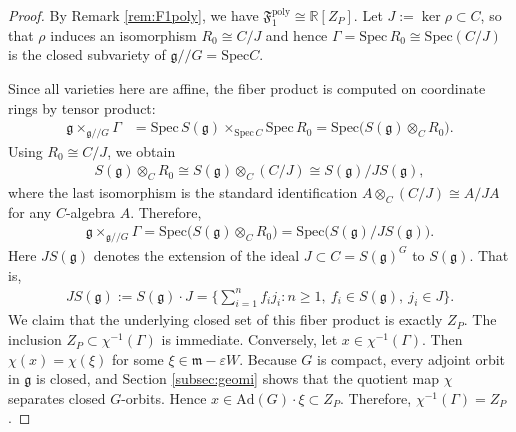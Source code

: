\documentclass[11pt]{amsart}
\theoremstyle{definition}
\theoremstyle{plain}
\theoremstyle{conclusion}
\begin{document}
\begin{proof}
By Remark \ref{rem:F1poly}, we have $\mathfrak{F}_1^{\mathrm{poly}}\cong \mathbb{R}[Z_P]$. Let $J:= \ker \rho \subset C$, so that $\rho$ induces an isomorphism $R_0\cong C/J$ and hence $\Gamma=\mathrm{Spec} \, R_0\cong \mathrm{Spec} (C/J)$ is the closed subvariety of $\mathfrak{g}//G= \mathrm{Spec}  C$.

Since all varieties here are affine, the fiber product is computed on coordinate rings by tensor product: \begin{align*}
\mathfrak{g}\times_{\mathfrak{g}//G}\Gamma &=\mathrm{Spec} \, S(\mathfrak{g})\times_{\mathrm{Spec} \, C}\mathrm{Spec} \, R_0  =\mathrm{Spec} \big(S(\mathfrak{g})\otimes_C R_0\big).
\end{align*} Using $R_0\cong C/J$, we obtain \begin{align*}
S(\mathfrak{g})\otimes_C R_0\cong S(\mathfrak{g})\otimes_C (C/J)\cong S(\mathfrak{g})/J S(\mathfrak{g}),
\end{align*} where the last isomorphism is the standard identification $A\otimes_C (C/J)\cong A/JA$ for any $C$-algebra $A$. Therefore, \begin{align*}
\mathfrak{g}\times_{\mathfrak{g}//G}\Gamma = \mathrm{Spec}\big(S(\mathfrak{g})\otimes_C R_0\big) = \mathrm{Spec}\big(S(\mathfrak{g})/J S(\mathfrak{g})\big).
\end{align*} Here $J S(\mathfrak{g})$ denotes the extension of the ideal $J\subset C=S(\mathfrak{g})^G$ to $S(\mathfrak{g})$. That is, \begin{align*}
    J S(\mathfrak{g}) := S(\mathfrak{g})\cdot J = \Big\{\sum_{i=1}^n f_i j_i : n\ge 1,\ f_i\in S(\mathfrak{g}),\ j_i\in J\Big\}.
\end{align*} We claim that the underlying closed set of this fiber product is exactly $Z_P$. The inclusion $Z_P\subset \chi^{-1}(\Gamma)$ is immediate. Conversely, let $x\in \chi^{-1}(\Gamma)$. Then $\chi(x)=\chi(\xi)$ for some $\xi\in \mathfrak{m}-\varepsilon W$. Because $G$ is compact, every adjoint orbit in $\mathfrak{g}$ is closed, and Section \ref{subsec:geomi} shows that the quotient map $\chi$ separates closed $G$-orbits. Hence $x\in \mathrm{Ad}(G)\cdot \xi\subset Z_P$. Therefore, $\chi^{-1}(\Gamma)=Z_P$.


\end{proof}
\end{document}
